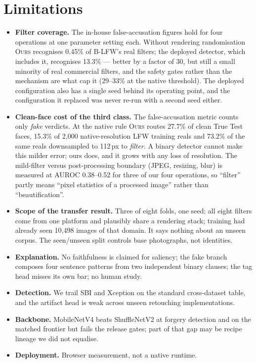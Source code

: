 \documentclass[conference]{IEEEtran}
\newcommand{\ours}{\textsc{Ours}}
\begin{document}
\section{Limitations}
\begin{itemize}
\item \textbf{Filter coverage.} The in-house false-accusation figures hold for four operations at
      one parameter setting each. Without rendering randomisation \ours{} recognises 0.45\% of
      B-LFW's real filters; the deployed detector, which includes it, recognises 13.3\% --- better
      by a factor of 30, but still a small minority of real commercial filters, and the safety
      gates rather than the mechanism are what cap it (29--33\% at the native threshold). The
      deployed configuration also has a single seed behind its operating point, and the
      configuration it replaced was never re-run with a second seed either.
\item \textbf{Clean-face cost of the third class.} The false-accusation metric counts only
      \emph{fake} verdicts. At the native rule \ours{} routes 27.7\% of clean True Test faces,
      15.3\% of 2{,}000 native-resolution LFW training reals and 73.2\% of the same reals
      downsampled to 112\,px to \emph{filter}. A binary detector cannot make this milder error;
      ours does, and it grows with any loss of resolution. The mild-filter versus
      post-processing boundary (JPEG, resizing, blur) is measured at AUROC 0.38--0.52 for
      three of our four operations, so ``filter'' partly means ``pixel statistics of a
      processed image'' rather than ``beautification''.
\item \textbf{Scope of the transfer result.} Three of eight folds, one seed; all eight filters
      come from one platform and plausibly share a rendering stack; training had already seen
      10{,}498 images of that domain. It says nothing about an unseen corpus. The seen/unseen
      split controls base photographs, not identities.
\item \textbf{Explanation.} No faithfulness is claimed for saliency; the fake branch composes
      four sentence patterns from two independent binary clauses; the tag head misses its own
      bar; no human study.
\item \textbf{Detection.} We trail SBI and Xception on the standard cross-dataset table, and
      the artifact head is weak across unseen retouching implementations.
\item \textbf{Backbone.} MobileNetV4 beats ShuffleNetV2 at forgery detection and on the matched
      frontier but fails the release gates; part of that gap may be recipe lineage we did not
      equalise.
\item \textbf{Deployment.} Browser measurement, not a native runtime.
\end{itemize}
\end{document}
